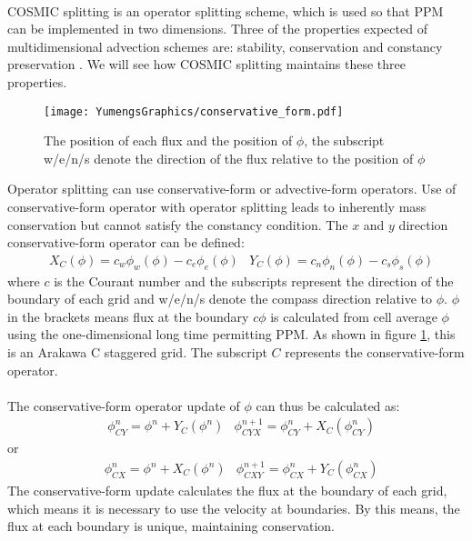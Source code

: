 \paragraph{}
COSMIC splitting is an operator splitting scheme, which is used so that PPM can be implemented in two dimensions. Three of the properties expected of multidimensional advection schemes are: stability, conservation and constancy preservation \citep{Lin1996}. We will see how COSMIC splitting \citep{Leonard1996} maintains these three properties.
\begin{figure}
\vspace{-10pt}
\centering
\texttt{[image: YumengsGraphics/conservative\_form.pdf]}
\vspace{-20pt}
\caption{The position of each flux and the position of $\phi$, the subscript w/e/n/s denote the direction of the flux relative to the position of $\phi$ \label{fig:2.2}}
\end{figure}
Operator splitting can use conservative-form or advective-form operators. Use of conservative-form operator with operator splitting leads to inherently mass conservation but cannot satisfy the constancy condition. The $x$ and $y$ direction conservative-form operator can be defined:
\begin{eqnarray}  \label{eq:2.13}
&X_{\scriptscriptstyle C}(\phi ) = c_{w}\phi_w(\phi )-c_e\phi_e(\phi ) 
&Y_{\scriptscriptstyle C}(\phi ) = c_{n}\phi_n(\phi )-c_s\phi_s(\phi )
\end{eqnarray}
where $c$ is the Courant number and the subscripts represent the direction of the boundary of each grid and w/e/n/s denote the compass direction relative to $\phi$. $\phi $ in the brackets means flux at the boundary $c\phi$ is calculated from cell average $\phi$ using the one-dimensional long time permitting PPM. As shown in figure \ref{fig:2.2}, this is an Arakawa C staggered grid. The subscript $C$ represents the conservative-form operator.
\paragraph{}
The conservative-form operator update of $\phi$ can thus be calculated as:
\begin{eqnarray} \label{eq:2.14}
&\phi^n_{\scriptscriptstyle CY} = \phi^n +Y_{\scriptscriptstyle C}(\phi^n)
&\phi^{n+1}_{\scriptscriptstyle CYX} = \phi^n_{\scriptscriptstyle CY} +X_{\scriptscriptstyle C}(\phi^n_{\scriptscriptstyle CY})
\end{eqnarray}
or
\begin{eqnarray*} 
&\phi^n_{\scriptscriptstyle CX} = \phi^n +X_{\scriptscriptstyle C}(\phi^n) 
&\phi^{n+1}_{\scriptscriptstyle CXY} = \phi^n_{\scriptscriptstyle CX} +Y_{\scriptscriptstyle C}(\phi^n_{\scriptscriptstyle CX})
\end{eqnarray*}
The conservative-form update calculates the flux at the boundary of each grid, which means it is necessary to use the velocity at boundaries.  By this means, the flux at each boundary is unique, maintaining conservation. 
